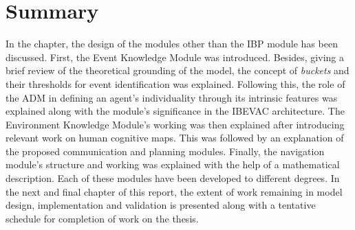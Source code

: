 \section{Summary}
\label{RemainingModulesSummar}

In the chapter, the design of the modules other than the IBP module has been discussed. First, the Event Knowledge Module was introduced. Besides, giving a brief review of the theoretical grounding of the model, the concept of \emph{buckets} and their thresholds for event identification was explained. Following this, the role of the ADM in defining an agent's individuality through its intrinsic features was explained along with the module's significance in the IBEVAC architecture. The Environment Knowledge Module's working was then explained after introducing relevant work on human cognitive maps. This was followed by an explanation of the proposed communication and planning modules. Finally, the navigation module's structure and working was explained with the help of a mathematical description. Each of these modules have been developed to different degrees. In the next and final chapter of this report, the extent of work remaining in model design, implementation and validation is presented along with a tentative schedule for completion of work on the thesis.
